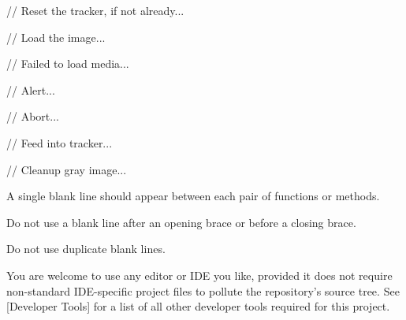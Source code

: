     // Reset the tracker, if not already...

    // Load the image...

        // Failed to load media...

            // Alert...

            // Abort...

    // Feed into tracker...
    
    // Cleanup gray image...
\stoptyping
\stopCodeExample

\item
A single blank line should appear between each pair of functions or methods. 

\item
Do not use a blank line after an opening brace or before a closing brace.

\item
Do not use duplicate blank lines.
\stopitemize


You are welcome to use any editor or IDE you like, provided it does not require non-standard IDE-specific project files to pollute the repository's source tree. See [Developer Tools] for a list of all other developer tools required for this project.

